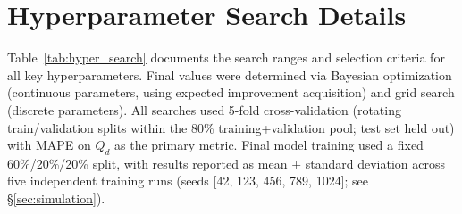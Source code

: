 \documentclass[usenatbib]{mnras}
\begin{document}



\appendix

\section{Hyperparameter Search Details}\label{app:hyper_search}

Table~\ref{tab:hyper_search} documents the search ranges and selection criteria for all key hyperparameters. Final values were determined via Bayesian optimization (continuous parameters, using expected improvement acquisition) and grid search (discrete parameters). All searches used 5-fold cross-validation (rotating train/validation splits within the 80\% training+validation pool; test set held out) with MAPE on $Q_d$ as the primary metric. Final model training used a fixed 60\%/20\%/20\% split, with results reported as mean $\pm$ standard deviation across five independent training runs (seeds [42, 123, 456, 789, 1024]; see \S\ref{sec:simulation}).
\end{document}
